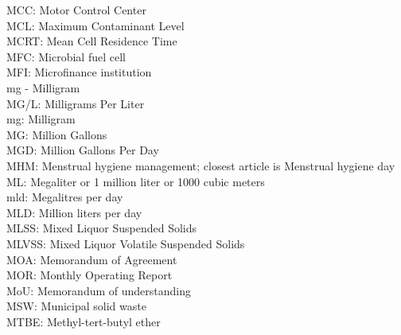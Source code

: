 \documentclass{article}
\begin{document}
MCC:  Motor Control Center
\vspace{0.3cm}\\
MCL:  Maximum Contaminant Level
\vspace{0.3cm}\\
MCRT:  Mean Cell Residence Time
\vspace{0.3cm}\\
MFC:  Microbial fuel cell
\vspace{0.3cm}\\
MFI:  Microfinance institution
\vspace{0.3cm}\\
mg - Milligram
\vspace{0.3cm}\\
MG/L:  Milligrams Per Liter
\vspace{0.3cm}\\
mg:  Milligram
\vspace{0.3cm}\\
MG:  Million Gallons
\vspace{0.3cm}\\
MGD:  Million Gallons Per Day
\vspace{0.3cm}\\
MHM:  Menstrual hygiene management; closest article is Menstrual hygiene day
\vspace{0.3cm}\\
ML:  Megaliter or 1 million liter or 1000 cubic meters
\vspace{0.3cm}\\
mld:  Megalitres per day
\vspace{0.3cm}\\
MLD:  Million liters per day
\vspace{0.3cm}\\
MLSS:  Mixed Liquor Suspended Solids
\vspace{0.3cm}\\
MLVSS:  Mixed Liquor Volatile Suspended Solids
\vspace{0.3cm}\\
MOA:  Memorandum of Agreement
\vspace{0.3cm}\\
MOR:  Monthly Operating Report
\vspace{0.3cm}\\
MoU:  Memorandum of understanding
\vspace{0.3cm}\\
MSW:  Municipal solid waste
\vspace{0.3cm}\\
MTBE:  Methyl-tert-butyl ether
\end{document}
